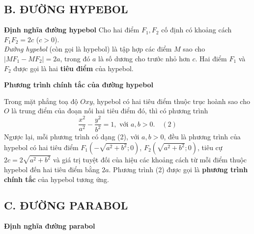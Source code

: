 \documentclass[12pt,a4paper]{extarticle}
\begin{document}
\subsection*{B. ĐƯỜNG HYPEBOL}
\noindent\textcolor{book}{\textbf{Định nghĩa đường hypebol}}
Cho hai điểm $F_1, F_2$ cố định có khoảng cách $F_1F_2 = 2c$ ($c > 0$).\\
\textit{Đường hypebol} (còn gọi là hypebol) là tập hợp các điểm $M$ sao cho $|MF_1 - MF_2| = 2a$, trong đó $a$ là số dương cho trước nhỏ hơn $c$. Hai điểm $F_1$ và $F_2$ được gọi là hai \textbf{tiêu điểm} của hypebol.
\begin{center}
\end{center}
\textbf{Phương trình chính tắc của đường hypebol}

Trong mặt phẳng toạ độ $Oxy$, hypebol có hai tiêu điểm thuộc trục hoành sao cho $O$ là trung điểm của đoạn nối hai tiêu điểm đó, thì có phương trình
\[ \frac{x^2}{a^2} - \frac{y^2}{b^2} = 1, \text{ với } a, b > 0. \quad (2) \]
Ngược lại, mỗi phương trình có dạng (2), với $a, b > 0$, đều là phương trình của hypebol có hai tiêu điểm $F_1(-\sqrt{a^2 + b^2}; 0)$, $F_2(\sqrt{a^2 + b^2}; 0)$, tiêu cự $2c = 2\sqrt{a^2 + b^2}$ và giá trị tuyệt đối của hiệu các khoảng cách từ mỗi điểm thuộc hypebol đến hai tiêu điểm bằng $2a$.
Phương trình (2) được gọi là \textbf{phương trình chính tắc} của hypebol tương ứng.
\vspace{0.5cm}
\subsection*{C. ĐƯỜNG PARABOL}
\textbf{Định nghĩa đường parabol}
\end{document}
